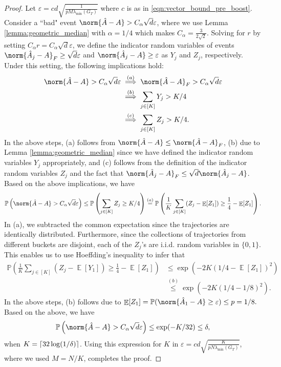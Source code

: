 \documentclass[letterpaper, 11 pt]{article}
\DeclarePairedDelimiter\ceil{\lceil}{\rceil}
\DeclareMathOperator{\E}{\mathbb{E}}
\begin{document}
\begin{proof}
    Let $\varepsilon = c d\sqrt{\frac{1}{p M \lambda_{\min}(G_T)}}$ where $c$ is as in \eqref{eqn:vector_bound_pre_boost}. Consider a ``bad" event $\norm{\hat{A} - A} > C_\alpha \sqrt{d}\varepsilon$, where we use Lemma \ref{lemma:geometric_median} with $\alpha = 1/4$ which makes $C_\alpha = \frac{3}{2\sqrt{2}}$. Solving for $r$ by setting $C_\alpha r = C_\alpha \sqrt{d}\varepsilon$, we define the indicator random variables of events $\norm{\hat{A}_j - A}_F \geq \sqrt{d}\varepsilon$ and $\norm{\hat{A}_j - A} \geq \varepsilon$ as $Y_j$ and $Z_j$, respectively. Under this setting, the following implications hold:
    \begin{align*}
        \norm{\hat{A} - A} > C_\alpha\sqrt{d}\varepsilon &\overset{(a)}{\implies} \norm{\hat{A} - A}_F > C_\alpha\sqrt{d}\varepsilon \\
        &\overset{(b)}{\implies} \sum_{j \in [K]} Y_j > K/4 \\
        &\overset{(c)}{\implies} \sum_{j \in [K]} Z_j > K/4.
    \end{align*}
    In the above steps, (a) follows from $\norm{\hat{A} - A} \leq \norm{\hat{A} - A}_F$, (b) due to Lemma \ref{lemma:geometric_median} since we have defined the indicator random variables $Y_j$ appropriately, and (c) follows from the definition of the indicator random variables $Z_j$ and the fact that $\norm{\hat{A}_j - A}_F \leq \sqrt{d} \norm{\hat{A}_j - A}$. Based on the above implications, we have
    \begin{align*}
        \mathbb{P}\left( \norm{\hat{A} - A} > C_\alpha \sqrt{d}\varepsilon \right) \leq \mathbb{P} \left( \sum_{j \in [K]} Z_j \geq K/4 \right) \overset{(a)}{=} \mathbb{P} \left( \frac{1}{K} \sum_{j \in [K]} (Z_j - \E[Z_1]) \geq \frac{1}{4}  - \E[Z_1] \right).
    \end{align*}
    In (a), we subtracted the common expectation since the trajectories are identically distributed. Furthermore, since the collections of trajectories from different buckets are disjoint, each of the $Z_j$'s are i.i.d. random variables in $\{0,1\}$. This enables us to use Hoeffding's inequality to infer that
    \begin{align*}
        \mathbb{P} \left( \frac{1}{K} \sum_{j \in [K]} (Z_j - \E[Y_1]) \geq \frac{1}{4}  - \E[Z_1] \right) &\leq \exp{\left(-2 K (1/4 - \E[Z_1])^2\right)} \\
        & \overset{(b)}{\leq} \exp{\left(-2 K (1/4 - 1/8)^2\right)}.
    \end{align*}
    In the above steps, (b) follows due to $\E[Z_1] = \mathbb{P}(\norm{\hat{A}_1 - A} \geq \varepsilon) \leq p = 1/8.$ Based on the above, we have
    $$ \mathbb{P}\left(\norm{\hat{A} - A} > C_\alpha \sqrt{d}\varepsilon \right) \leq \exp(-K/32) \leq \delta,$$
    when $K=\ceil{32 \log(1/\delta)}$. Using this expression for $K$ in $\varepsilon= c d\sqrt{\frac{K}{p N \lambda_{\min}(G_T)}}$, where we used $M=N/K$, completes the proof.
\end{proof}
\newpage
\end{document}
